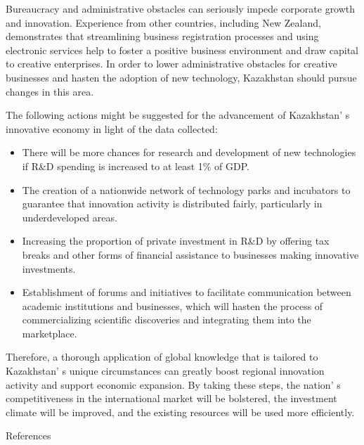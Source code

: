 Bureaucracy and administrative obstacles can seriously impede corporate
growth and innovation. Experience from other countries, including New
Zealand, demonstrates that streamlining business registration processes
and using electronic services help to foster a positive business
environment and draw capital to creative enterprises. In order to lower
administrative obstacles for creative businesses and hasten the adoption
of new technology, Kazakhstan should pursue changes in this area.

The following actions might be suggested for the advancement of
Kazakhstan' s innovative economy in light of the data
collected:

\begin{itemize}
\item
  There will be more chances for research and development of new
  technologies if R\&D spending is increased to at least 1\% of GDP.
\item
  The creation of a nationwide network of technology parks and
  incubators to guarantee that innovation activity is distributed
  fairly, particularly in underdeveloped areas.
\item
  Increasing the proportion of private investment in R\&D by offering
  tax breaks and other forms of financial assistance to businesses
  making innovative investments.
\item
  Establishment of forums and initiatives to facilitate communication
  between academic institutions and businesses, which will hasten the
  process of commercializing scientific discoveries and integrating them
  into the marketplace.
\end{itemize}

Therefore, a thorough application of global knowledge that is tailored
to Kazakhstan' s unique circumstances can greatly boost
regional innovation activity and support economic expansion. By taking
these steps, the nation' s competitiveness in the
international market will be bolstered, the investment climate will be
improved, and the existing resources will be used more efficiently.

References


